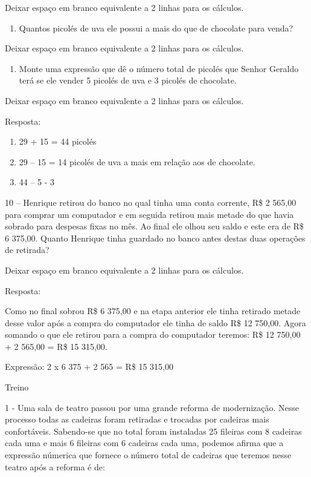Deixar espaço em branco equivalente a 2 linhas para os cálculos.

\begin{enumerate}
\def\labelenumi{\alph{enumi})}
\item
  Quantos picolés de uva ele possui a mais do que de chocolate para
  venda?
\end{enumerate}

Deixar espaço em branco equivalente a 2 linhas para os cálculos.

\begin{enumerate}
\def\labelenumi{\alph{enumi})}
\item
  Monte uma expressão que dê o número total de picolés que Senhor
  Geraldo terá se ele vender 5 picolés de uva e 3 picolés de chocolate.
\end{enumerate}

Deixar espaço em branco equivalente a 2 linhas para os cálculos.

Resposta:

\begin{enumerate}
\def\labelenumi{\alph{enumi})}
\item
  29 + 15 = 44 picolés
\item
  29 -- 15 = 14 picolés de uva a mais em relação aos de chocolate.
\item
  44 -- 5 - 3
\end{enumerate}

10 -- Henrique retirou do banco no qual tinha uma conta corrente, R\$ 2
565,00 para comprar um computador e em seguida retirou mais metade do
que havia sobrado para despesas fixas no mês. Ao final ele olhou seu
saldo e este era de R\$ 6 375,00. Quanto Henrique tinha guardado no
banco antes destas duas operações de retirada?

Deixar espaço em branco equivalente a 2 linhas para os cálculos.

Resposta:

Como no final sobrou R\$ 6 375,00 e na etapa anterior ele tinha retirado
metade desse valor após a compra do computador ele tinha de saldo R\$ 12
750,00. Agora somando o que ele retirou para a compra do computador
teremos: R\$ 12 750,00 + 2 565,00 = R\$ 15 315,00.

Expressão: 2 x 6 375 + 2 565 = R\$ 15 315,00

Treino

1 - Uma sala de teatro passou por uma grande reforma de modernização.
Nesse processo todas as cadeiras foram retiradas e trocadas por cadeiras
mais confortáveis. Sabendo-se que no total foram instaladas 25 fileiras
com 8 cadeiras cada uma e mais 6 fileiras com 6 cadeiras cada uma,
podemos afirma que a expressão númerica que fornece o número total de
cadeiras que teremos nesse teatro após a reforma é de:

